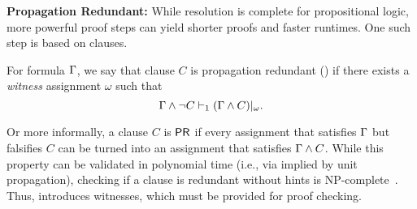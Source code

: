 
\textbf{Propagation Redundant:} While resolution is complete for propositional
logic, more powerful proof steps can yield shorter proofs and faster runtimes.
One such step is based on \pr clauses.

\begin{definition}
    For formula $\Gamma$, we say that clause $C$ is propagation redundant
    (\pr) if there exists a \emph{witness} assignment $\omega$ such that
$$
    \Gamma \land \lnot C \vdash_1 (\Gamma \land C)|_\omega.
$$
\end{definition}


   Or more informally, a clause $C$ is $\textsf{PR}$ if every assignment that satisfies
   $\Gamma$ but falsifies $C$ can be turned into an assignment that satisfies
   $\Gamma \land C$. While this property can be validated in polynomial time
   (i.e., via implied by unit propagation), checking if a clause is redundant
   without hints is NP-complete~\cite{prclauses}. Thus, \pr introduces witnesses,
   which must be provided for proof checking.  






